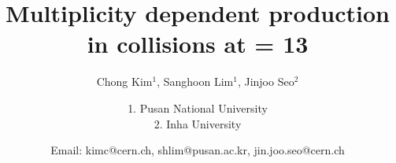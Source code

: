 \documentclass[ALICE,manyauthors]{ALICE_analysis_notes}
\begin{document}
%
 \begin{titlepage}
 \title{Multiplicity dependent \Xic production in \pp collisions at \s = 13 \TeV}
 \author{Chong Kim$^{1}$, Sanghoon Lim$^{1}$, Jinjoo Seo$^{2}$}
 \author{1. Pusan National University\\ 2. Inha University}
 \author{Email: kimc@cern.ch, shlim@pusan.ac.kr, jin.joo.seo@cern.ch}
  \begin{abstract}
  \end{abstract}
 \end{titlepage}
%
\tableofcontents
\clearpage
%
 \clearpage
 \clearpage
 \clearpage
 \clearpage
 \clearpage
%


\end{document}
